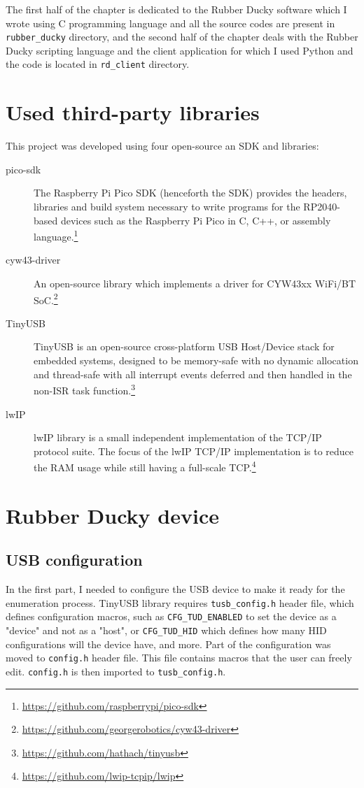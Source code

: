 The first half of the chapter is dedicated to the Rubber Ducky software which I wrote using C programming language and all the source codes are present in \verb|rubber_ducky| directory, and the second half of the chapter deals with the Rubber Ducky scripting language and the client application for which I used Python and the code is located in \verb|rd_client| directory.

\section{Used third-party libraries}
This project was developed using four open-source an SDK and libraries:
\begin{description}
    \item [pico-sdk] The Raspberry Pi Pico SDK (henceforth the SDK) provides the headers, libraries and build system necessary to write programs for the RP2040-based devices such as the Raspberry Pi Pico in C, C++, or assembly language.\footnote{\url{https://github.com/raspberrypi/pico-sdk}}
    \item [cyw43-driver] An open-source library which implements a driver for CYW43xx WiFi/BT SoC.\footnote{\url{https://github.com/georgerobotics/cyw43-driver}}
    \item [TinyUSB] TinyUSB is an open-source cross-platform USB Host/Device stack for embedded systems, designed to be memory-safe with no dynamic allocation and thread-safe with all interrupt events deferred and then handled in the non-ISR task function.\footnote{\url{https://github.com/hathach/tinyusb}}
    \item [lwIP] lwIP library is a small independent implementation of the TCP/IP protocol suite. The focus of the lwIP TCP/IP implementation is to reduce the RAM usage while still having a full-scale TCP.\footnote{\url{https://github.com/lwip-tcpip/lwip}}
\end{description}

\section{Rubber Ducky device}
\subsection{USB configuration}
In the first part, I needed to configure the USB device to make it ready for the enumeration process. TinyUSB library requires \verb|tusb_config.h| header file, which defines configuration macros, such as \verb|CFG_TUD_ENABLED| to set the device as a "device" and not as a "host", or \verb|CFG_TUD_HID| which defines how many HID configurations will the device have, and more. Part of the configuration was moved to \verb|config.h| header file. This file contains macros that the user can freely edit. \verb|config.h| is then imported to \verb|tusb_config.h|.

